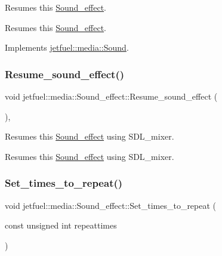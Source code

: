 Resumes this \hyperlink{classjetfuel_1_1media_1_1Sound__effect}{Sound\+\_\+effect}. 

Resumes this \hyperlink{classjetfuel_1_1media_1_1Sound__effect}{Sound\+\_\+effect}. 

Implements \hyperlink{classjetfuel_1_1media_1_1Sound_af781fccd8ebb1305e97dc8f6b7c828dc}{jetfuel\+::media\+::\+Sound}.

\mbox{\label{classjetfuel_1_1media_1_1Sound__effect_aa810e2cf5bd4f147b81755690c96f203}} 
\subsubsection{\texorpdfstring{Resume\+\_\+sound\+\_\+effect()}{Resume\_sound\_effect()}}
{\footnotesize\ttfamily void jetfuel\+::media\+::\+Sound\+\_\+effect\+::\+Resume\+\_\+sound\+\_\+effect (\begin{DoxyParamCaption}{ }\end{DoxyParamCaption})\hspace{0.3cm}{\ttfamily [inline]}, {\ttfamily [protected]}}



Resumes this \hyperlink{classjetfuel_1_1media_1_1Sound__effect}{Sound\+\_\+effect} using S\+D\+L\+\_\+mixer. 

Resumes this \hyperlink{classjetfuel_1_1media_1_1Sound__effect}{Sound\+\_\+effect} using S\+D\+L\+\_\+mixer. \mbox{\label{classjetfuel_1_1media_1_1Sound__effect_a79c40daad35fcce6cd7553747273f457}} 
\subsubsection{\texorpdfstring{Set\+\_\+times\+\_\+to\+\_\+repeat()}{Set\_times\_to\_repeat()}}
{\footnotesize\ttfamily void jetfuel\+::media\+::\+Sound\+\_\+effect\+::\+Set\+\_\+times\+\_\+to\+\_\+repeat (\begin{DoxyParamCaption}\item[{const unsigned int}]{repeattimes }\end{DoxyParamCaption})\hspace{0.3cm}{\ttfamily [inline]}}



